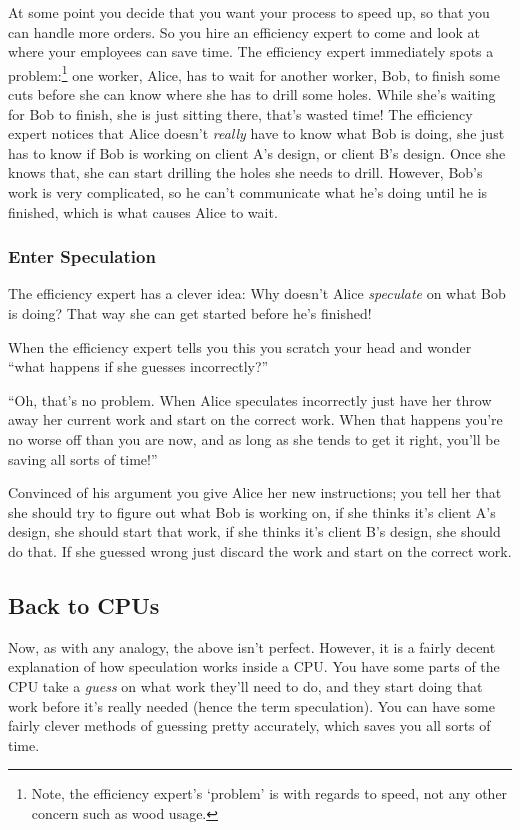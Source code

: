 \documentclass{article}
\begin{document}
At some point you decide that you want your process to speed up, so that you
can handle more orders. So you hire an efficiency expert to come and look at
where your employees can save time. The efficiency expert immediately spots a
problem:\footnote{Note, the efficiency expert's `problem' is with regards to
speed, not any other concern such as wood usage.} one worker, Alice, has to
wait for another worker, Bob, to finish some cuts before she can know where
she has to drill some holes. While she's waiting for Bob to finish, she is
just sitting there, that's wasted time!  The efficiency expert notices that
Alice doesn't \emph{really} have to know what Bob is doing, she just has to
know if Bob is working on client A's design, or client B's design. Once she
knows that, she can start drilling the holes she needs to drill. However,
Bob's work is very complicated, so he can't communicate what he's doing until
he is finished, which is what causes Alice to wait.

\subsubsection*{Enter Speculation}

The efficiency expert has a clever idea: Why doesn't Alice \emph{speculate}
on what Bob is doing? That way she can get started before he's finished!

When the efficiency expert tells you this you scratch your head and wonder
``what happens if she guesses incorrectly?''

``Oh, that's no problem. When Alice speculates incorrectly just have her throw
away her current work and start on the correct work. When that happens you're
no worse off than you are now, and as long as she tends to get it right, you'll
be saving all sorts of time!''

Convinced of his argument you give Alice her new instructions; you tell her
that she should try to figure out what Bob is working on, if she thinks it's
client A's design, she should start that work, if she thinks it's client B's
design, she should do that. If she guessed wrong just discard the work and
start on the correct work.


\subsection*{Back to CPUs}

Now, as with any analogy, the above isn't perfect. However, it is a fairly
decent explanation of how speculation works inside a CPU. You have some parts
of the CPU take a \emph{guess} on what work they'll need to do, and they start
doing that work before it's really needed (hence the term speculation). You can
have some fairly clever methods of guessing pretty accurately, which saves you
all sorts of time.
\end{document}
